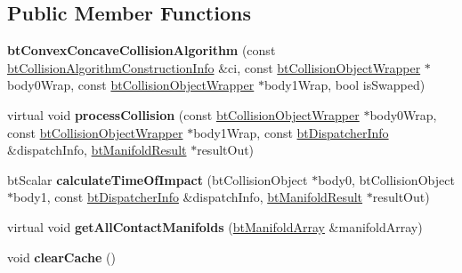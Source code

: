 \subsection*{Public Member Functions}
\begin{DoxyCompactItemize}
\item 
\hypertarget{classbt_convex_concave_collision_algorithm_a163b3a3ea828565ea58e6acfd7434505}{{\bfseries bt\+Convex\+Concave\+Collision\+Algorithm} (const \hyperlink{structbt_collision_algorithm_construction_info}{bt\+Collision\+Algorithm\+Construction\+Info} \&ci, const \hyperlink{structbt_collision_object_wrapper}{bt\+Collision\+Object\+Wrapper} $\ast$body0\+Wrap, const \hyperlink{structbt_collision_object_wrapper}{bt\+Collision\+Object\+Wrapper} $\ast$body1\+Wrap, bool is\+Swapped)}\label{classbt_convex_concave_collision_algorithm_a163b3a3ea828565ea58e6acfd7434505}

\item 
\hypertarget{classbt_convex_concave_collision_algorithm_af9942ac6cc9024779ec2687c092d2d17}{virtual void {\bfseries process\+Collision} (const \hyperlink{structbt_collision_object_wrapper}{bt\+Collision\+Object\+Wrapper} $\ast$body0\+Wrap, const \hyperlink{structbt_collision_object_wrapper}{bt\+Collision\+Object\+Wrapper} $\ast$body1\+Wrap, const \hyperlink{structbt_dispatcher_info}{bt\+Dispatcher\+Info} \&dispatch\+Info, \hyperlink{classbt_manifold_result}{bt\+Manifold\+Result} $\ast$result\+Out)}\label{classbt_convex_concave_collision_algorithm_af9942ac6cc9024779ec2687c092d2d17}

\item 
\hypertarget{classbt_convex_concave_collision_algorithm_a6d6690180cedd5e41c5ce632a2fb2350}{bt\+Scalar {\bfseries calculate\+Time\+Of\+Impact} (bt\+Collision\+Object $\ast$body0, bt\+Collision\+Object $\ast$body1, const \hyperlink{structbt_dispatcher_info}{bt\+Dispatcher\+Info} \&dispatch\+Info, \hyperlink{classbt_manifold_result}{bt\+Manifold\+Result} $\ast$result\+Out)}\label{classbt_convex_concave_collision_algorithm_a6d6690180cedd5e41c5ce632a2fb2350}

\item 
\hypertarget{classbt_convex_concave_collision_algorithm_adc2ee2058d09d696b42e64f1ab03ef93}{virtual void {\bfseries get\+All\+Contact\+Manifolds} (\hyperlink{classbt_aligned_object_array}{bt\+Manifold\+Array} \&manifold\+Array)}\label{classbt_convex_concave_collision_algorithm_adc2ee2058d09d696b42e64f1ab03ef93}

\item 
\hypertarget{classbt_convex_concave_collision_algorithm_a73fa1c9ce188094312b3372e1948dcf5}{void {\bfseries clear\+Cache} ()}\label{classbt_convex_concave_collision_algorithm_a73fa1c9ce188094312b3372e1948dcf5}

\end{DoxyCompactItemize}
